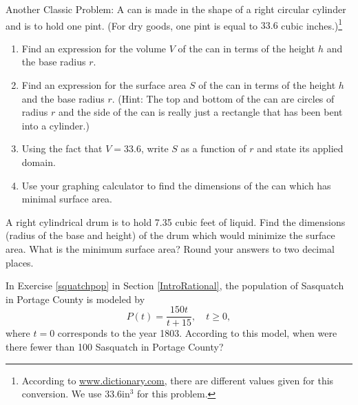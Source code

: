 \documentclass{ximera}
\begin{document}
\begin{problem}
Another Classic Problem: A can is made in the shape of a right circular cylinder and is to hold one pint. (For dry goods, one pint is equal to $33.6$ cubic inches.)\footnote{According to \href{http://dictionary.reference.com/browse/pint}{\underline{www.dictionary.com}}, there are different values given for this conversion. We use $33.6 \text{in}^{3}$ for this problem.}  

\begin{enumerate}

\item Find an expression for the volume $V$ of the can in terms of the height $h$ and the base radius $r$.
\item Find an expression for the surface area $S$ of the can in terms of the height $h$ and the base radius $r$.  (Hint: The top and bottom of the can are circles of radius $r$ and the side of the can is really just a rectangle that has been bent into a cylinder.)
\item Using the fact that $V = 33.6$, write $S$ as a function of $r$ and state its applied domain.
\item Use your graphing calculator to find the dimensions of the can which has minimal surface area.

\end{enumerate}
\end{problem}

\begin{problem}
A right cylindrical drum is to hold 7.35 cubic feet of liquid.  Find the dimensions (radius of the base and height) of the drum which would minimize the surface area.  What is the minimum surface area?  Round your answers to two decimal places.
\end{problem} 

\begin{problem}
In Exercise \ref{squatchpop} in Section \ref{IntroRational}, the population of Sasquatch in Portage County is modeled by  \[P(t) = \frac{150t}{t + 15}, \quad t \geq 0,\] where $t = 0$ corresponds to the year 1803.  According to this model, when were there fewer than 100 Sasquatch in Portage County?
\end{problem}
\end{document}

